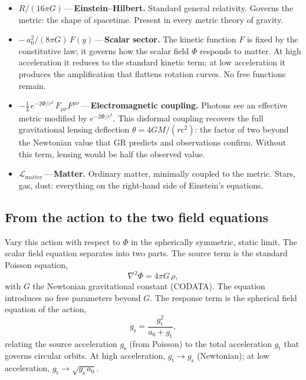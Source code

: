 \documentclass[aps,twocolumn,amsmath,amssymb,reprint,nofootinbib,nobalancelastpage]{revtex4-2}
\begin{document}
\begin{itemize}
\item $R/(16\pi G)$\,---\,\textbf{Einstein--Hilbert.} Standard general relativity. Governs the metric: the shape of spacetime. Present in every metric theory of gravity.
\item $-\,a_0^2/(8\pi G)\,F(y)$\,---\,\textbf{Scalar sector.} The kinetic function $F$ is fixed by the constitutive law; it governs how the scalar field $\Phi$ responds to matter. At high acceleration it reduces to the standard kinetic term; at low acceleration it produces the amplification that flattens rotation curves. No free functions remain.
\item $-\tfrac{1}{4}\,e^{-2\Phi/c^2}\,F_{\mu\nu}F^{\mu\nu}$\,---\,\textbf{Electromagnetic coupling.} Photons see an effective metric modified by $e^{-2\Phi/c^2}$. This disformal coupling recovers the full gravitational lensing deflection $\theta = 4GM/(rc^2)$: the factor of two beyond the Newtonian value that GR predicts and observations confirm. Without this term, lensing would be half the observed value.
\item $\mathcal{L}_{\mathrm{matter}}$\,---\,\textbf{Matter.} Ordinary matter, minimally coupled to the metric. Stars, gas, dust: everything on the right-hand side of Einstein's equations.
\end{itemize}

\subsection{From the action to the two field equations}
\label{subsec:spherical}

Vary this action with respect to $\Phi$ in the spherically symmetric, static limit. The scalar field equation separates into two parts. The source term is the standard Poisson equation,
\begin{equation}
\nabla^2\Phi = 4\pi G\,\rho,
\end{equation}
with $G$ the Newtonian gravitational constant (CODATA). The equation introduces no free parameters beyond $G$. The response term is the spherical field equation of the action,
\begin{equation}
g_{\mathrm{s}} = \frac{g_{\mathrm{t}}^2}{a_0 + g_{\mathrm{t}}},
\label{eq:transition}
\end{equation}
relating the source acceleration $g_{\mathrm{s}}$ (from Poisson) to the total acceleration $g_{\mathrm{t}}$ that governs circular orbits. At high acceleration, $g_{\mathrm{t}} \to g_{\mathrm{s}}$ (Newtonian); at low acceleration, $g_{\mathrm{t}} \to \sqrt{g_{\mathrm{s}}\,a_0}$.
\end{document}
